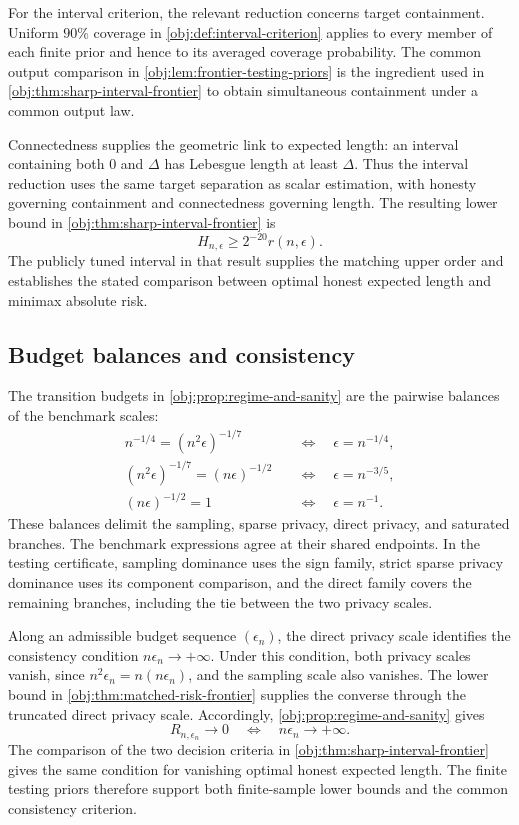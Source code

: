 For the interval criterion, the relevant reduction concerns target containment. Uniform \(90\%\) coverage in \cref{obj:def:interval-criterion} applies to every member of each finite prior and hence to its averaged coverage probability. The common output comparison in \cref{obj:lem:frontier-testing-priors} is the ingredient used in \cref{obj:thm:sharp-interval-frontier} to obtain simultaneous containment under a common output law.

Connectedness supplies the geometric link to expected length: an interval containing both \(0\) and \(\Delta\) has Lebesgue length at least \(\Delta\). Thus the interval reduction uses the same target separation as scalar estimation, with honesty governing containment and connectedness governing length. The resulting lower bound in \cref{obj:thm:sharp-interval-frontier} is
\[
H_{n,\epsilon}\ge2^{-20}r(n,\epsilon).
\]
The publicly tuned interval in that result supplies the matching upper order and establishes the stated comparison between optimal honest expected length and minimax absolute risk.

\subsection{Budget balances and consistency}

The transition budgets in \cref{obj:prop:regime-and-sanity} are the pairwise balances of the benchmark scales:
\[
\begin{aligned}
n^{-1/4}=(n^2\epsilon)^{-1/7}
&\quad\Longleftrightarrow\quad \epsilon=n^{-1/4},\\
(n^2\epsilon)^{-1/7}=(n\epsilon)^{-1/2}
&\quad\Longleftrightarrow\quad \epsilon=n^{-3/5},\\
(n\epsilon)^{-1/2}=1
&\quad\Longleftrightarrow\quad \epsilon=n^{-1}.
\end{aligned}
\]
These balances delimit the sampling, sparse privacy, direct privacy, and saturated branches. The benchmark expressions agree at their shared endpoints. In the testing certificate, sampling dominance uses the sign family, strict sparse privacy dominance uses its component comparison, and the direct family covers the remaining branches, including the tie between the two privacy scales.

Along an admissible budget sequence \((\epsilon_n)\), the direct privacy scale identifies the consistency condition \(n\epsilon_n\to+\infty\). Under this condition, both privacy scales vanish, since \(n^2\epsilon_n=n(n\epsilon_n)\), and the sampling scale also vanishes. The lower bound in \cref{obj:thm:matched-risk-frontier} supplies the converse through the truncated direct privacy scale. Accordingly, \cref{obj:prop:regime-and-sanity} gives
\[
R_{n,\epsilon_n}\longrightarrow0
\quad\Longleftrightarrow\quad
n\epsilon_n\longrightarrow+\infty.
\]
The comparison of the two decision criteria in \cref{obj:thm:sharp-interval-frontier} gives the same condition for vanishing optimal honest expected length. The finite testing priors therefore support both finite-sample lower bounds and the common consistency criterion.
